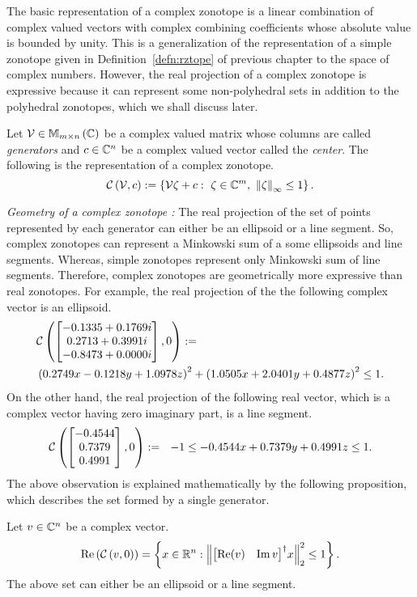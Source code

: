The basic representation of a complex zonotope is a linear combination
of complex valued vectors with complex combining coefficients whose
absolute value is bounded by unity.  This is a generalization of the
representation of a simple zonotope given in Definition~\ref{defn:rztope} of
previous chapter to the space of complex numbers.  However, the real
projection of a complex zonotope is expressive because it can
represent some non-polyhedral sets in addition to the polyhedral
zonotopes, which we shall discuss later.
%
\begin{definition}
Let $\mathcal{V}\in\mathbb{M}_{m\times n}\left(\mathbb{C}\right)$ be a complex valued matrix
whose columns are called {\it generators} and $c\in\mathbb{C}^n$ be a
complex valued vector called the {\it center}.  The following is the
representation of a
complex zonotope.
%
\begin{equation}
\mathit{\mathcal{C}}\left(\mathcal{V},c\right) := \left\{\mathcal{V}\zeta+c:~\zeta\in\mathbb{C}^m,~\left\|\zeta\right\|_{\infty}\leq 1\right\}.
\end{equation}
%
\end{definition}
%
{\it Geometry of a complex zonotope :}
The real projection of the set of points represented by each generator
can either be an ellipsoid or a line segment.  So, complex
zonotopes can represent a Minkowski sum of a some ellipsoids and line
segments.  Whereas, simple zonotopes represent only Minkowski sum of
line segments.  Therefore, complex zonotopes are geometrically more
expressive than real zonotopes.
For example, the real projection of the the following complex vector
is an ellipsoid.
%
\begin{align*}
& \mathit{\mathcal{C}}\left(\left[\begin{matrix}-0.1335 + 0.1769i\\0.2713 + 0.3991i\\-0.8473 + 0.0000i\end{matrix}\right],0\right):=~~\\
&  \left(0.2749x-0.1218y+1.0978z\right)^2+\left(1.0505x+2.0401y+0.4877z\right)^2\leq 1.
\end{align*}
%
On the other hand, the real projection of the following real vector, which is a
complex vector having zero imaginary part, is a line segment.
%
\begin{align*}
\mathit{\mathcal{C}}\left(\left[\begin{matrix}-0.4544\\
    0.7379\\
    0.4991\end{matrix}\right],0\right):=~~-1\leq -0.4544x+0.7379y+0.4991z\leq 1.
\end{align*}
%
The above observation is explained mathematically by the following
proposition, which describes the set formed by a single generator.  
%
\begin{proposition}
Let $v\in\mathbb{C}^n$ be a complex vector.  
%
\[
\operatorname{Re}\left(\mathit{\mathcal{C}}\left(v,0\right)\right)=\left\{x\in\mathbb{R}^n:\left\|{\left[\begin{matrix}\operatorname{Re}(v)&\operatorname{Im}{v}\end{matrix}\right]}^\dagger x\right\|_2^2\leq
1\right\}.
\]
%
The above set can either be an ellipsoid or a line segment.
\end{proposition}
